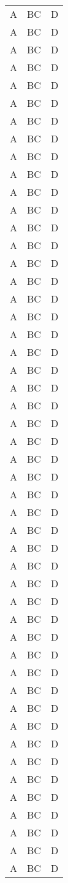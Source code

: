\begin{longtable}{|l|l|l|}
A & BC & D \\
A & BC & D \\
A & BC & D \\
A & BC & D \\
A & BC & D \\
A & BC & D \\
A & BC & D \\
A & BC & D \\
A & BC & D \\
A & BC & D \\
A & BC & D \\
A & BC & D \\
A & BC & D \\
A & BC & D \\
A & BC & D \\
A & BC & D \\
A & BC & D \\
A & BC & D \\
A & BC & D \\
A & BC & D \\
A & BC & D \\
A & BC & D \\
A & BC & D \\
A & BC & D \\
A & BC & D \\
A & BC & D \\
A & BC & D \\
A & BC & D \\
A & BC & D \\
A & BC & D \\
A & BC & D \\
A & BC & D \\
A & BC & D \\
A & BC & D \\
A & BC & D \\
A & BC & D \\
A & BC & D \\
A & BC & D \\
A & BC & D \\
A & BC & D \\
A & BC & D \\
A & BC & D \\
A & BC & D \\
A & BC & D \\
A & BC & D \\
A & BC & D \\
A & BC & D \\
A & BC & D \\
A & BC & D \\

\end{longtable}
